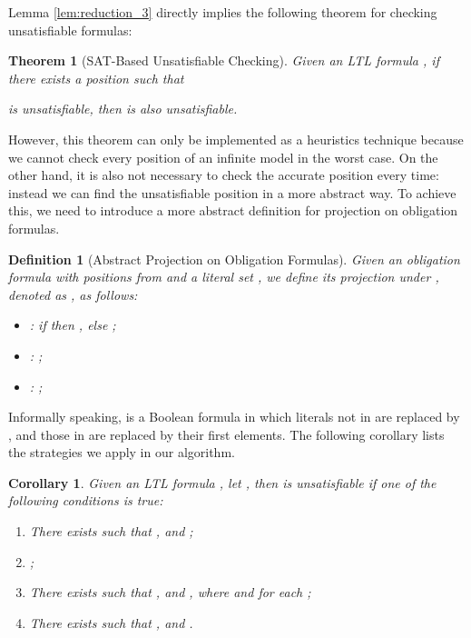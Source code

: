 \documentclass[conference]{IEEEtran}
\newtheorem{definition}{Definition}
\newtheorem{theorem}{Theorem}
\newtheorem{proof}{IEEEproof}
\newtheorem{corollary}{Corollary}
\begin{document}
Lemma \ref{lem:reduction_3} directly implies the following theorem for checking unsatisfiable 
formulas:  

\begin{theorem}[SAT-Based Unsatisfiable Checking]\label{thm:satunsat}
    Given an LTL formula , if there exists a position  such that 
     
    is unsatisfiable, then  is also unsatisfiable. 
\end{theorem}

\iffalse
\begin{proof}
  One can check easily that, this theorem is immediately proven by applying the reverse law on 
  Lemma \ref{lem:reduction_3}.
\end{proof}
\fi

However, this theorem can only be implemented as a heuristics technique because we cannot check 
every position of an infinite model in the worst case. On the other hand, it is also not necessary 
to check the 
accurate position every time: instead we can find the unsatisfiable position in a more 
abstract way. 
To achieve this, we need to introduce a more abstract definition for projection on obligation formulas.

\begin{definition}[Abstract Projection on Obligation Formulas]\label{def:ofp_abstract}
  Given an obligation formula with positions  from 
  and a literal set , we define its projection under , denoted
  as , as follows:
    \begin{itemize}
      \item : if  then , else 
      ;
      \item : ;
      \item : ;
    \end{itemize}

\end{definition}

Informally speaking,  is a Boolean formula in which literals not in  are 
replaced by , and those in  are replaced by their first elements. 
The following corollary lists the strategies we apply in our algorithm. 

\begin{corollary}\label{coro:abstract}
  Given an LTL formula , let , then  is unsatisfiable if one of the
  following conditions is true:
  \begin{enumerate}
    \item There exists  such that , and ;
    \item ;
    \item There exists  such that , and ,
      where  and  for each ;
    \item There exists  such that , and 
    .
  \end{enumerate}
\end{corollary}
\end{document}
